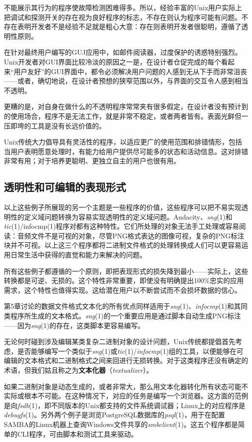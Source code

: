 \documentclass[12pt,oneside]{book}
\begin{document}
不能展示其行为的程序使故障检测困难得多。所以，经验丰富的Unix用户实际上把调试和探测开关的存在视为良好程序的标志，不存在则认为程序可能有问题。不存在表明开发者不是经验不足就是粗心大意：存在则表明开发者很聪明，遵循了透明性原则。

在针对最终用户编写的GUJ应用中，如邮件阅读器，过度保护的诱惑特别强烈。Unix开发者对GUI界面比较冷淡的原因之一是，在设计者仓促完成的每个看起来“用户友好”的GUI界面中，都令必须解决用户问题的人感到无从下手而非常沮丧——或者，确切地说，在设计者预想的狭窄范围以外，与界面的交互令人感到相当不透明。

更糟的是，对自身在做什么的不透明程序常常夹有很多假定，在设计者没有预计到的使用场合，程序不是无法工作，就是非常不稳定，或者两者皆有。表面光鲜但一压即垮的工具是没有长远价值的。

Unix传统大力倡导具有灵活性的程序，以适应更广的使用范围和排错情形，包括当用户表明愿意处理时，有能力给用户提供尽可能多的状态和活动信息。这对排错非常有用；对于培养更聪明、更独立自主的用户也很有用。

\subsection{透明性和可编辑的表现形式}
以上这些例子所展现的另一个主题是一些程序的价值，这些程序可以把不易实现透明性的定义域问题转换为容易实现透明性的定义域问题。Audacity、\textit{sng}(1)和\textit{tic}(1)/infocmp(1)程序对都有这种特性。它们所处理的对象无法手工处理或容易阅读：音频文件不是可视的对象，尽管PNG格式表达的图像可视，复杂的PNG标注块并不可视。以上这三个程序都将二进制文件格式的处理转换成人们可以更容易运用日常生活中获得的直觉和能力来解决的问题。

所有这些例子都遵循的一个原则，即把表现形式的损失降到最小——实际上，这些转换都是可逆、无损的。这个特性非常重要，即使没有明确提出100\%{}忠实的应用需求，这个特性也值得实现。这给潜在用户以不断尝试而不会损坏数据的信心。

第5章讨论的数据文件格式文本化的所有优点同样适用于\textit{sng}(1)、\textit{infocmp}(1)和其同类程序所生成的文本格式。\textit{sng}(1)的一个重要应用是通过脚本自动生成PNG标注——因为\textit{sng}(1)的存在，这类脚本更容易编写。

无论何时碰到涉及编辑某类复杂二进制对象的设计问题，Unix传统都提倡首先考虑，是否能够编写一个类似于\textit{sng}(1)或\textit{tic}(1)/\textit{infocmp}(1)组的工具，以便能够在可编辑的文本格式和二进制格式之间来回进行无损转换。对于这类程序还没有确定的术语，但我们姑且称之为\textbf{文本化器}（\textit{textualizer}）。

如果二进制对象是动态生成的，或者非常大，那么用文本化器转化所有状态可能不实际或根本不可能。在这种情况下，对应的任务是编写一个浏览器。这方面的范例是向\textit{fsdb}(1)，即不同版本的Unix都支持的文件系统调试器；Linux上的对应程序是\textit{debugfs}(1)。另外两个例子是浏览PostgreSQL数据库的\textit{psql}(1)，用于在配置SAMBA的Linux机器上查询Windows文件共享的\textit{smbclient}(1)。这五个程序都是简单的CLI程序，可由脚本和测试工具来驱动。
\end{document}
